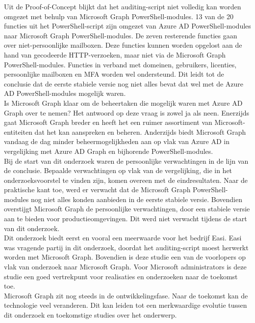 Uit de Proof-of-Concept blijkt dat het auditing-script niet volledig kan worden omgezet met behulp van Microsoft Graph PowerShell-modules. 13 van de 20 functies uit het PowerShell-script zijn omgezet van Azure \Ac{AD} PowerShell-modules naar Microsoft Graph PowerShell-modules. De zeven resterende functies gaan over niet-persoonlijke mailboxen. Deze functies kunnen worden opgelost aan de hand van gecodeerde \ac{HTTP}-verzoeken, maar niet via de Microsoft Graph PowerShell-modules. Functies in verband met domeinen, gebruikers, licenties, persoonlijke mailboxen en \Ac{MFA} worden wel ondersteund. Dit leidt tot de conclusie dat de eerste stabiele versie nog niet alles bevat dat wel met de Azure \Ac{AD} PowerShell-modules mogelijk waren. \\ 

Is Microsoft Graph klaar om de beheertaken die mogelijk waren met Azure \Ac{AD} Graph over te nemen? Het antwoord op deze vraag is zowel ja als neen. Enerzijds gaat Microsoft Graph breder en heeft het een ruimer assortiment van Microsoft-entiteiten dat het kan aanspreken en beheren. Anderzijds biedt Microsoft Graph vandaag de dag minder beheermogelijkheden aan op vlak van Azure \Ac{AD} in vergelijking met Azure \Ac{AD} Graph en bijhorende PowerShell-modules. \\

Bij de start van dit onderzoek waren de persoonlijke verwachtingen in de lijn van de conclusie. Bepaalde verwachtingen op vlak van de vergelijking, die in het onderzoeksvoorstel te vinden zijn, komen overeen met de eindresultaten. Naar de praktische kant toe, werd er verwacht dat de Microsoft Graph PowerShell-modules nog niet alles konden aanbieden in de eerste stabiele versie. Bovendien overstijgt Microsoft Graph de persoonlijke verwachtingen, door een stabiele versie aan te bieden voor productieomgevingen. Dit werd niet verwacht tijdens de start van dit onderzoek. \\

Dit onderzoek biedt eerst en vooral een meerwaarde voor het bedrijf Easi. Easi was vragende partij in dit onderzoek, doordat het auditing-script moest herwerkt worden met Microsoft Graph. Bovendien is deze studie een van de voorlopers op vlak van onderzoek naar Microsoft Graph. Voor Microsoft administrators is deze studie een goed vertrekpunt voor realisaties en onderzoeken naar de toekomst toe. \\

Microsoft Graph zit nog steeds in de ontwikkelingsfase. Naar de toekomst kan de technologie veel veranderen. Dit kan leiden tot een merkwaardige evolutie tussen dit onderzoek en toekomstige studies over het onderwerp. 
 

